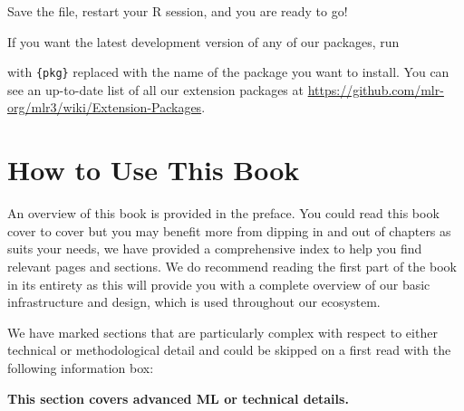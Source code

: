 Save the file, restart your R session, and you are ready to go!

If you want the latest development version of any of our packages, run

\begin{Shaded}
\begin{Highlighting}[]
\SpecialCharTok{::}\NormalTok{(}\NormalTok{)}
\end{Highlighting}
\end{Shaded}

with \texttt{\{pkg\}} replaced with the name of the package you want to
install. You can see an up-to-date list of all our extension packages at
\url{https://github.com/mlr-org/mlr3/wiki/Extension-Packages}.

\hypertarget{howtouse}{%
\section{How to Use This Book}\label{howtouse}}

An overview of this book is provided in the preface.
You could read this book cover to cover but you may benefit more from dipping in and out of chapters as suits your needs, we have provided a comprehensive index to help you find relevant pages and sections.
We do recommend reading the first part of the book in its entirety as this will provide you with a complete overview of our basic infrastructure and design, which is used throughout our ecosystem.

We have marked sections that are particularly complex with respect to
either technical or methodological detail and could be skipped on a
first read with the following information box:

\begin{tcolorbox}[enhanced jigsaw, colframe=quarto-callout-note-color-frame, rightrule=.15mm, bottomrule=.15mm, toprule=.15mm, opacityback=0, colback=white, left=2mm, arc=.35mm, breakable, leftrule=.75mm]
\begin{minipage}[t]{5.5mm}
\textcolor{quarto-callout-note-color}{\faInfo}
\end{minipage}%
\begin{minipage}[t]{\textwidth - 5.5mm}

\textbf{This section covers advanced ML or technical
details.}\vspace{2mm}

\end{minipage}%
\end{tcolorbox}

